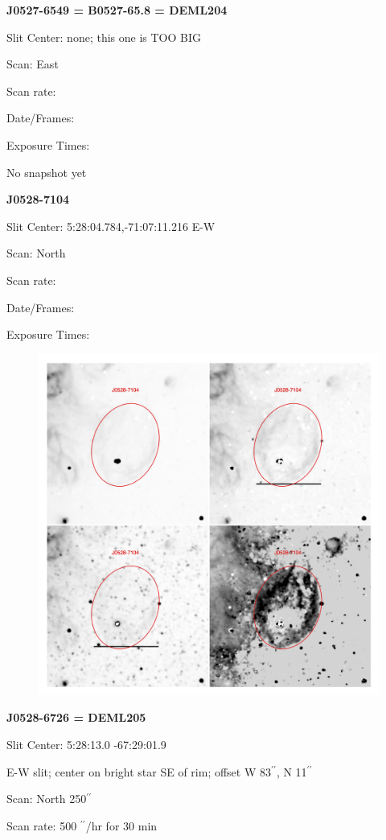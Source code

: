 \documentclass[11pt]{article}
\begin{document}
\newpage
{\bf J0527-6549 = B0527-65.8 = DEML204}  
 
Slit Center:   none; this one is TOO BIG

Scan:  East

Scan rate:  

Date/Frames:

Exposure Times:  

No snapshot yet
\begin{figure}
\end{figure}

\newpage
{\bf J0528-7104}  
 
Slit Center:   5:28:04.784,-71:07:11.216  E-W

Scan:  North

Scan rate:  

Date/Frames:

Exposure Times:  

\begin{figure}
\includegraphics[width=11.cm]{snapshots/J0528-7104_big.png}
\end{figure}

\newpage
{\bf J0528-6726 = DEML205}  
 
Slit Center:   5:28:13.0  -67:29:01.9  

E-W slit; center on bright star SE of rim; offset W 83$^{\prime\prime}$, N 11$^{\prime\prime}$

Scan:  North 250$^{\prime\prime}$

Scan rate:  500 $^{\prime\prime}$/hr for 30 min
\end{document}
